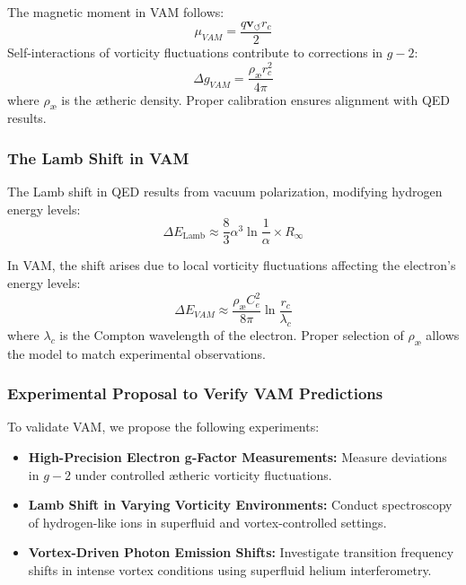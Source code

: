 \documentclass[a4paper,10pt]{article}
\begin{document}
The magnetic moment in VAM follows:
\begin{equation*}
    \mu_{VAM} = \frac{q \mathbf{v}_{\scriptscriptstyle\boldsymbol{\circlearrowleft}} r_c}{2}
\end{equation*}
Self-interactions of vorticity fluctuations contribute to corrections in $g-2$:
\begin{equation*}
    \Delta g_{VAM} = \frac{\rho_\text{\ae} r_c^2}{4\pi}
\end{equation*}
where $\rho_\text{\ae}$ is the ætheric density. Proper calibration ensures alignment with QED results.

\subsubsection*{The Lamb Shift in VAM}
The Lamb shift in QED results from vacuum polarization, modifying hydrogen energy levels:
\begin{equation*}
    \Delta E_\text{Lamb} \approx \frac{8}{3} \alpha^3 \ln \frac{1}{\alpha} \times R_{\infty}
\end{equation*}

In VAM, the shift arises due to local vorticity fluctuations affecting the electron's energy levels:
\begin{equation*}
    \Delta E_{VAM} \approx \frac{\rho_\text{\ae} C_e^2}{8\pi} \ln \frac{r_c}{\lambda_c}
\end{equation*}
where $\lambda_c$ is the Compton wavelength of the electron. Proper selection of $\rho_\text{\ae}$ allows the model to match experimental observations.

\subsubsection*{Experimental Proposal to Verify VAM Predictions}
To validate VAM, we propose the following experiments:
\begin{itemize}
    \item \textbf{High-Precision Electron g-Factor Measurements:} Measure deviations in $g-2$ under controlled ætheric vorticity fluctuations.
    \item \textbf{Lamb Shift in Varying Vorticity Environments:} Conduct spectroscopy of hydrogen-like ions in superfluid and vortex-controlled settings.
    \item \textbf{Vortex-Driven Photon Emission Shifts:} Investigate transition frequency shifts in intense vortex conditions using superfluid helium interferometry.
\end{itemize}
\end{document}
